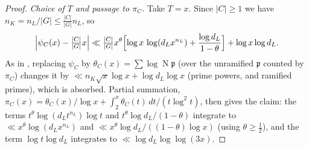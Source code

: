 \documentclass[11pt]{amsart}
\theoremstyle{definition}
\theoremstyle{remark}
\newcommand{\fp}{\mathfrak{p}}
\DeclareMathOperator{\Nm}{N}
\begin{document}
\begin{proof}
\emph{Choice of $T$ and passage to $\pi_C$.} Take $T=x$. Since $|C|\ge1$ we have $n_K=n_L/|G|\le\frac{|C|}{|G|}n_L$, so
\[
  \Bigl|\psi_C(x)-\tfrac{|C|}{|G|}x\Bigr|\ll\tfrac{|C|}{|G|}x^\theta\Bigl[\log x\,\log(d_Lx^{n_L})+\frac{\log d_L}{1-\theta}\Bigr]+\log x\log d_L .
\]
As in \cite[\S9]{LO}, replacing $\psi_C$ by $\theta_C(x)=\sum\log\Nm\fp$ (over the unramified $\fp$ counted by
$\pi_C$) changes it by $\ll n_K\sqrt x\log x+\log d_L\log x$ (prime powers, and ramified primes), which is absorbed.
Partial summation, $\pi_C(x)=\theta_C(x)/\log x+\int_2^x\theta_C(t)\,dt/(t\log^2t)$, then gives the claim: the terms
$t^\theta\log(d_Lt^{n_L})\log t$ and $t^\theta\log d_L/(1-\theta)$ integrate to $\ll x^\theta\log(d_Lx^{n_L})$ and
$\ll x^\theta\log d_L/((1-\theta)\log x)$ (using $\theta\ge\frac12$), and the term $\log t\log d_L$ integrates to
$\ll\log d_L\log\log(3x)$.
\end{proof}
\end{document}

